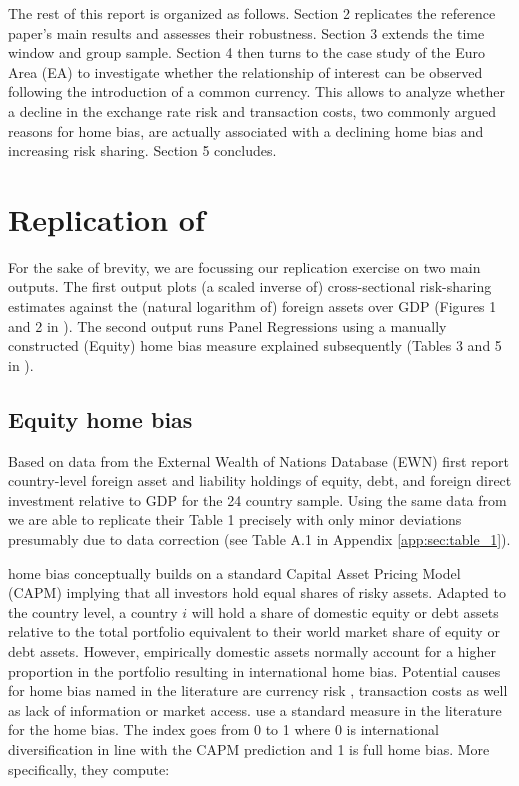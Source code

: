 \documentclass[11pt,a4paper]{article}
\begin{document}
The rest of this report is organized as follows. Section 2 replicates the reference paper's main results and assesses their robustness. Section 3 extends the time window and group sample. Section 4 then turns to the case study of the Euro Area (EA) to investigate whether the relationship of interest can be observed following the introduction of a common currency.
This allows to analyze whether a decline in the exchange rate risk and transaction costs, two commonly argued reasons for home bias, are actually associated with a declining home bias and increasing risk sharing. Section 5 concludes. \\

\section{Replication of \textcite{main}}\label{sec:replication}
For the sake of brevity, we are focussing our replication exercise on two main outputs. The first output plots (a scaled inverse of) cross-sectional risk-sharing estimates against the (natural logarithm of) foreign assets over GDP (Figures 1 and 2 in \textcite{main}). The second output runs Panel Regressions using a manually constructed (Equity) home bias measure explained subsequently (Tables 3 and 5 in \textcite{main}).

\subsection{Equity home bias}\label{subsec:home_bias}

Based on data from the External Wealth of Nations Database (EWN) \textcite{main} first report country-level foreign asset and liability holdings of equity, debt, and foreign direct investment 
relative to GDP for the 24 country sample. Using the same data from \textcite{lane2018external} we are able to replicate their Table 1 precisely with only minor deviations 
presumably due to data correction (see Table A.1 in Appendix \ref{app:sec:table_1}).

home bias conceptually builds on a standard Capital Asset Pricing Model (CAPM) implying that all investors hold equal shares of risky assets. Adapted to the country level, a country $i$ will
hold a share of domestic equity or debt assets relative to the total portfolio equivalent to their world market share of equity or debt assets. However, empirically domestic assets 
normally account for a higher proportion in the portfolio resulting in international home bias. Potential causes for home bias named in the literature are currency risk \parencite{AdlerDumas1983}, transaction costs \parencite{CooperKaplanis1994} as well as lack of information or market access.
\textcite{main} use a standard measure in the literature for the home bias. The index goes from 0 to 1 where 0 is international diversification in line with the CAPM prediction and 1 is full home bias. 
More specifically, they compute:
\end{document}

